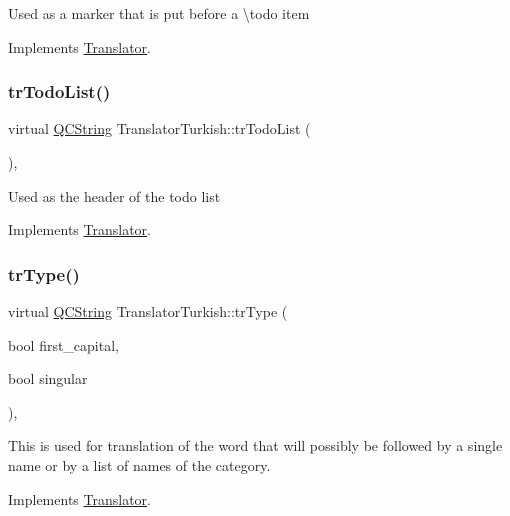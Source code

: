 Used as a marker that is put before a \textbackslash{}todo item 

Implements \mbox{\hyperlink{class_translator}{Translator}}.

\mbox{\label{class_translator_turkish_a9e5adbd3e474eefadeffda56c853cb4a}} 
\subsubsection{\texorpdfstring{trTodoList()}{trTodoList()}}
{\footnotesize\ttfamily virtual \mbox{\hyperlink{class_q_c_string}{Q\+C\+String}} Translator\+Turkish\+::tr\+Todo\+List (\begin{DoxyParamCaption}{ }\end{DoxyParamCaption})\hspace{0.3cm}{\ttfamily [inline]}, {\ttfamily [virtual]}}

Used as the header of the todo list 

Implements \mbox{\hyperlink{class_translator}{Translator}}.

\mbox{\label{class_translator_turkish_a373bbc3a42c1aba21346da9cbb2efaee}} 
\subsubsection{\texorpdfstring{trType()}{trType()}}
{\footnotesize\ttfamily virtual \mbox{\hyperlink{class_q_c_string}{Q\+C\+String}} Translator\+Turkish\+::tr\+Type (\begin{DoxyParamCaption}\item[{bool}]{first\+\_\+capital,  }\item[{bool}]{singular }\end{DoxyParamCaption})\hspace{0.3cm}{\ttfamily [inline]}, {\ttfamily [virtual]}}

This is used for translation of the word that will possibly be followed by a single name or by a list of names of the category. 

Implements \mbox{\hyperlink{class_translator}{Translator}}.

\mbox{\label{class_translator_turkish_a3e6e23b9cb29cc47facfca10da942af7}} 
